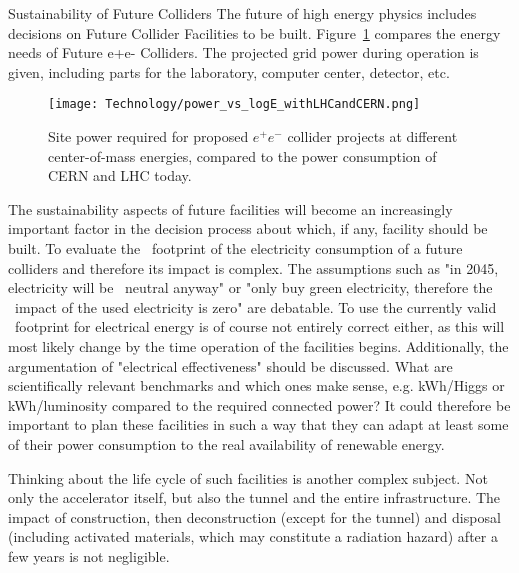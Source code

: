 \documentclass[../SustainableHEP.tex]{subfiles}
\begin{document}
\begin{casestudy}{Sustainability of Future Colliders}%
\noindent The future of high energy physics includes decisions on Future Collider Facilities to be built. Figure~\ref{fig:powerCollider} compares the energy needs of Future e+e- Colliders. The projected grid power during operation is given, including parts for the laboratory, computer center, detector, etc.

\begin{figure}
    \texttt{[image: Technology/power\_vs\_logE\_withLHCandCERN.png]}
    \caption{Site power required for proposed $e^+e^-$ collider projects at different center-of-mass energies, compared to the power consumption of CERN and LHC today. ~\cite{privateJList} }\label{fig:powerCollider}
\end{figure}


The sustainability aspects of future facilities will become an increasingly important factor in the decision process about which, if any, facility should be built.
To evaluate the \CdO\ footprint of the electricity consumption of a future colliders and therefore its impact is complex. The assumptions such as "in 2045, electricity will be \CdO\ neutral anyway" or "only buy green electricity, therefore the \CdO\ impact of the used electricity is zero" are debatable. To use the currently valid \CdO\ footprint for electrical energy is of course not entirely correct either, as this will most likely change by the time operation of the facilities begins.
Additionally, the argumentation of "electrical effectiveness" should be discussed. What are scientifically relevant benchmarks and which ones make sense, e.g. kWh/Higgs or kWh/luminosity compared to the required connected power?
It could therefore be important to plan these facilities in such a way that they can adapt at least some of their power consumption to the real availability of renewable energy. 

Thinking about the life cycle of such facilities is another complex subject. Not only the accelerator itself, but also the tunnel and the entire infrastructure. The impact of construction, then deconstruction (except for the tunnel) and disposal (including activated materials, which may constitute a radiation hazard) after a few years is not negligible.
\end{casestudy}
\end{document}

